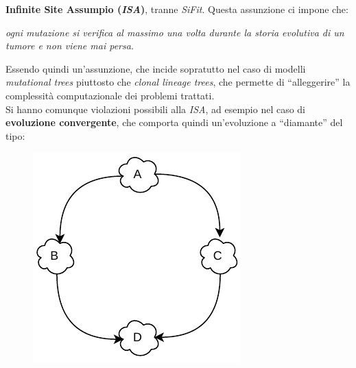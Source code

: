 \documentclass[a4paper,12pt, oneside]{book}
\begin{document}
\textbf{Infinite Site Assumpio (\textit{ISA})}, tranne \textit{SiFit}. Questa
assunzione ci impone che:
\begin{center}
  \textit{ogni mutazione si verifica al massimo una volta durante la storia
    evolutiva di un tumore e non viene mai persa.} 
\end{center}
Essendo quindi un'assunzione, che incide sopratutto nel caso di modelli
\textit{mutational trees} piuttosto che \textit{clonal lineage trees}, che
permette di ``alleggerire'' la complessità computazionale dei problemi
trattati.\\
Si hanno comunque violazioni possibili alla \textit{ISA}, ad esempio nel caso di
\textbf{evoluzione convergente}, che comporta quindi un'evoluzione a
``diamante'' del tipo:
\begin{figure}[H]
  \centering
  \includegraphics[scale = 0.9]{img/dt.pdf}
\end{figure}
\end{document}
